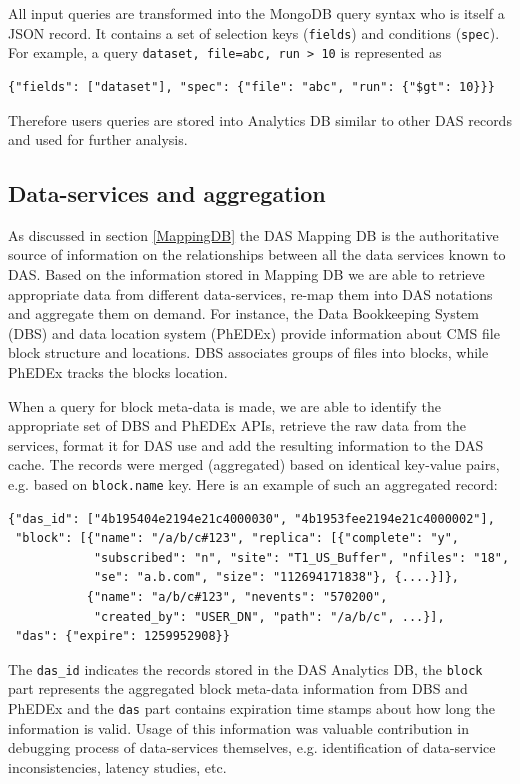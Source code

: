 \documentclass[1p,times]{elsarticle}
\begin{document}
All input queries are transformed into the MongoDB query syntax who is itself
a JSON record. It contains a set of selection 
keys (\verb+fields+) and conditions (\verb+spec+). For example, a query
\verb+dataset, file=abc, run > 10+
is represented as
\begin{verbatim}
{"fields": ["dataset"], "spec": {"file": "abc", "run": {"$gt": 10}}}
\end{verbatim}
Therefore users queries are stored into Analytics DB similar to other DAS 
records and used for further analysis.

\subsection{Data-services and aggregation}
As discussed in section \ref{MappingDB} the DAS Mapping DB 
is the authoritative source of information on the relationships between 
all the data services known to DAS.
Based on the information stored in Mapping DB we are able to 
retrieve appropriate data from different data-services, re-map them into 
DAS notations and aggregate them on demand. For instance, the Data 
Bookkeeping System (DBS) \cite{DBS} and data location system (PhEDEx) \cite{PhEDEx}
provide information about CMS file block structure and locations.
DBS associates groups of files into blocks, while PhEDEx tracks the blocks
location. 

When a query for block meta-data is made, we are
able to identify the appropriate set of 
DBS and PhEDEx APIs, retrieve the raw data from the services, format it
for DAS use and add the resulting information to the DAS cache. The records
were merged (aggregated) based on identical key-value pairs, e.g.
based on \verb+block.name+ key. Here is an example of such an aggregated record:
\begin{verbatim}
{"das_id": ["4b195404e2194e21c4000030", "4b1953fee2194e21c4000002"], 
 "block": [{"name": "/a/b/c#123", "replica": [{"complete": "y", 
            "subscribed": "n", "site": "T1_US_Buffer", "nfiles": "18", 
            "se": "a.b.com", "size": "112694171838"}, {....}]},
           {"name": "a/b/c#123", "nevents": "570200", 
            "created_by": "USER_DN", "path": "/a/b/c", ...}],
 "das": {"expire": 1259952908}}
\end{verbatim}
The \verb+das_id+ indicates the records stored in the DAS Analytics DB,
the \verb+block+ part represents the aggregated block meta-data information from DBS
and PhEDEx and the \verb+das+ part contains expiration time stamps
about how long the information is valid.
Usage of this information was valuable contribution in debugging process of
data-services themselves, e.g. identification of data-service inconsistencies, 
latency studies, etc.
\end{document}
